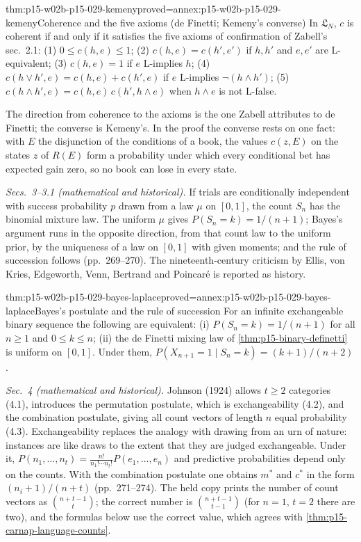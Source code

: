 \begin{hbtheorem}{thm:p15-w02b-p15-029-kemeny}{proved=annex:p15-w02b-p15-029-kemeny}{Coherence and the five axioms (de Finetti; Kemeny's converse)}
In \(\mathfrak L_N\), \(c\) is coherent if and only if it satisfies the
five axioms of confirmation of Zabell's sec.~2.1: (1)
\(0\leq c(h,e)\leq1\); (2) \(c(h,e)=c(h',e')\) if \(h,h'\) and
\(e,e'\) are L-equivalent; (3) \(c(h,e)=1\) if \(e\) L-implies \(h\);
(4) \(c(h\lor h',e)=c(h,e)+c(h',e)\) if \(e\) L-implies
\(\neg(h\land h')\); (5) \(c(h\land h',e)=c(h,e)\,c(h',h\land e)\) when
\(h\land e\) is not L-false.
\end{hbtheorem}

The direction from coherence to the axioms is the one Zabell attributes
to de Finetti; the converse is Kemeny's. In the proof the converse
rests on one fact: with \(E\) the disjunction of the conditions of a
book, the values \(c(z,E)\) on the states \(z\) of \(R(E)\) form a
probability under which every conditional bet has expected gain zero,
so no book can lose in every state.

\emph{Secs.~3--3.1 (mathematical and historical).} If trials are
conditionally independent with success probability \(p\) drawn from a
law \(\mu\) on \([0,1]\), the count \(S_n\) has the binomial mixture
law. The uniform \(\mu\) gives \(P(S_n=k)=1/(n+1)\); Bayes's
argument runs in the opposite direction, from that count law to the
uniform prior, by the uniqueness of a law on \([0,1]\) with given
moments; and the rule of succession follows (pp.~269--270). The
nineteenth-century criticism by Ellis, von Kries, Edgeworth, Venn,
Bertrand and Poincaré is reported as history.

\begin{hbtheorem}{thm:p15-w02b-p15-029-bayes-laplace}{proved=annex:p15-w02b-p15-029-bayes-laplace}{Bayes's postulate and the rule of succession}
For an infinite exchangeable binary sequence the following are
equivalent: (i) \(P(S_n=k)=1/(n+1)\) for all \(n\geq1\) and
\(0\leq k\leq n\); (ii) the de Finetti mixing law of
\cref{thm:p15-binary-definetti} is uniform on \([0,1]\). Under them,
\(P(X_{n+1}=1\mid S_n=k)=(k+1)/(n+2)\).
\end{hbtheorem}

\emph{Sec.~4 (mathematical and historical).} Johnson (1924) allows
\(t\geq2\) categories (4.1), introduces the permutation postulate,
which is exchangeability (4.2), and the combination postulate, giving
all count vectors of length \(n\) equal probability (4.3). Exchangeability
replaces the analogy with drawing from an urn of nature: instances are
like draws to the extent that they are judged exchangeable. Under it,
\(P(n_1,\ldots,n_t)=\frac{n!}{n_1!\cdots n_t!}P(e_1,\ldots,e_n)\)
and predictive probabilities depend only on the counts. With the
combination postulate one obtains \(m^*\) and \(c^*\) in the form
\((n_i+1)/(n+t)\) (pp.~271--274). The held copy prints the number of
count vectors as \(\binom{n+t-1}t\); the correct number is
\(\binom{n+t-1}{t-1}\) (for \(n=1\), \(t=2\) there are two), and
the formulas below use the correct value, which agrees with
\cref{thm:p15-carnap-language-counts}.

